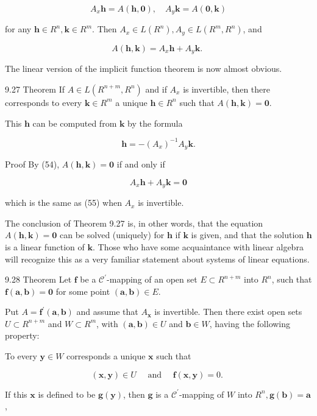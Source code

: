 \documentclass[10pt]{article}
\begin{document}
$$
A_{x} \mathbf{h}=A(\mathbf{h}, \mathbf{0}), \quad A_{y} \mathbf{k}=A(\mathbf{0}, \mathbf{k})
$$

for any $\mathbf{h} \in R^{n}, \mathbf{k} \in R^{m}$. Then $A_{x} \in L\left(R^{n}\right), A_{y} \in L\left(R^{m}, R^{n}\right)$, and

$$
A(\mathbf{h}, \mathbf{k})=A_{x} \mathbf{h}+A_{y} \mathbf{k} \text {. }
$$

The linear version of the implicit function theorem is now almost obvious.

9.27 Theorem If $A \in L\left(R^{n+m}, R^{n}\right)$ and if $A_{x}$ is invertible, then there corresponds to every $\mathbf{k} \in R^{m}$ a unique $\mathbf{h} \in R^{n}$ such that $A(\mathbf{h}, \mathbf{k})=\mathbf{0}$.

This $\mathbf{h}$ can be computed from $\mathbf{k}$ by the formula

$$
\mathbf{h}=-\left(A_{x}\right)^{-1} A_{y} \mathbf{k} .
$$

Proof By (54), $A(\mathbf{h}, \mathbf{k})=\mathbf{0}$ if and only if

$$
A_{x} \mathbf{h}+A_{y} \mathbf{k}=\mathbf{0}
$$

which is the same as (55) when $A_{x}$ is invertible.

The conclusion of Theorem 9.27 is, in other words, that the equation $A(\mathbf{h}, \mathbf{k})=\mathbf{0}$ can be solved (uniquely) for $\mathbf{h}$ if $\mathbf{k}$ is given, and that the solution $\mathbf{h}$ is a linear function of $\mathbf{k}$. Those who have some acquaintance with linear algebra will recognize this as a very familiar statement about systems of linear equations.

9.28 Theorem Let $\mathbf{f}$ be a $\mathscr{C}^{\prime}$-mapping of an open set $E \subset R^{n+m}$ into $R^{n}$, such that $\mathbf{f}(\mathbf{a}, \mathbf{b})=\mathbf{0}$ for some point $(\mathbf{a}, \mathbf{b}) \in E$.

Put $A=\mathbf{f}^{\prime}(\mathbf{a}, \mathbf{b})$ and assume that $A_{\boldsymbol{x}}$ is invertible. Then there exist open sets $U \subset R^{n+m}$ and $W \subset R^{m}$, with $(\mathbf{a}, \mathbf{b}) \in U$ and $\mathbf{b} \in W$, having the following property:

To every $\mathbf{y} \in W$ corresponds a unique $\mathbf{x}$ such that

$$
(\mathbf{x}, \mathbf{y}) \in U \quad \text { and } \quad \mathbf{f}(\mathbf{x}, \mathbf{y})=0 \text {. }
$$

If this $\mathbf{x}$ is defined to be $\mathbf{g}(\mathbf{y})$, then $\mathbf{g}$ is a $\mathscr{C}^{\prime}$-mapping of $W$ into $R^{n}, \mathbf{g}(\mathbf{b})=\mathbf{a}$,
\end{document}
